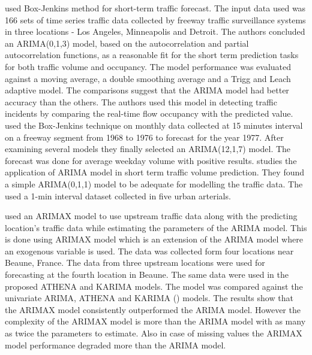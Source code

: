 \citet{ahmed1979analysis} used Box-Jenkins method for short-term traffic forecast. The input data
used was 166 sets of time series traffic data collected by freeway traffic surveillance systems in
three locations - Los Angeles, Minneapolis and Detroit. The authors concluded an ARIMA(0,1,3)
model, based on the autocorrelation and partial autocorrelation functions, as a reasonable fit for
the short term prediction tasks for both traffic volume and occupancy. The model performance was
evaluated against a moving average, a double smoothing average and a Trigg and Leach adaptive
model. The comparisons suggest that the ARIMA model had better accuracy than the others. The
authors used this model in detecting traffic incidents by comparing the real-time flow occupancy
with the predicted value. \citet{nihan1980use} used the Box-Jenkins technique on monthly data
collected at 15 minutes interval on a freeway segment from 1968 to 1976 to forecast for the year
1977. After examining several models they finally selected an ARIMA(12,1,7) model. The forecast
was done for average weekday volume with positive results. \citet{hamed1995short} studies the
application of ARIMA model in short term traffic volume prediction. They found a simple ARIMA(0,1,1)
model to be adequate for modelling the traffic data. The used a 1-min interval dataset collected in
five urban arterials.

\citet{williams2001multivariate} used an ARIMAX model to use upstream traffic data along with the
predicting location's traffic data while estimating the parameters of the ARIMA model. This is
done using ARIMAX model which is an extension of the ARIMA model where an exogenous variable is
used. The data was collected form four locations near Beaune, France. The data from three upstream
locations were used for forecasting at the fourth location in Beaune. The same data were used
in the proposed ATHENA and KARIMA models. The model was compared  against the univariate ARIMA,
ATHENA\citet{danech1991athena} and KARIMA (\citet{van1996combining}) models. The results show that
the ARIMAX model consistently outperformed the ARIMA model. However the complexity of the ARIMAX
model is more than the ARIMA model with as many as twice the parameters to estimate. Also in case
of missing values the ARIMAX model performance degraded more than the ARIMA model.

